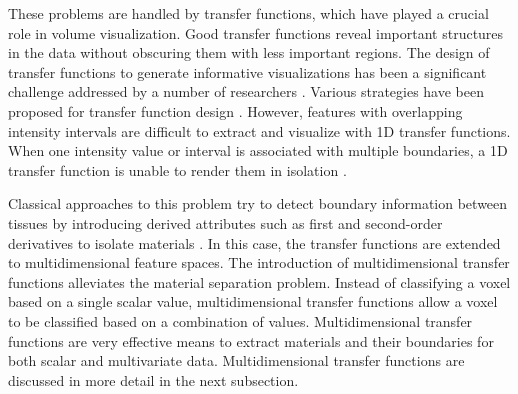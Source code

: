 These problems are handled by transfer functions, which have played a crucial role in volume visualization.
Good transfer functions reveal important structures in the data without obscuring them with less important regions.
The design of transfer functions to generate informative visualizations has been a significant challenge addressed by a number of researchers \cite{pfister_transfer_2001}.
Various strategies have been proposed for transfer function design \cite{hadwiger_real-time_2006}.
However, features with overlapping intensity intervals are difficult to extract and visualize with 1D transfer functions.
When one intensity value or interval is associated with multiple boundaries, a 1D transfer function is unable to render them in isolation \cite{kniss_multidimensional_2002}.

Classical approaches to this problem try to detect boundary information between tissues by introducing derived attributes such as first and second-order derivatives to isolate materials \cite{kindlmann_semi-automatic_1998} \cite{kniss_multidimensional_2002}. In this case, the transfer functions are extended to multidimensional feature spaces. 
The introduction of multidimensional transfer functions alleviates the material separation problem.
Instead of classifying a voxel based on a single scalar value, multidimensional transfer functions allow a voxel to be classified based on a combination of values.
Multidimensional transfer functions are very effective means to extract materials and their boundaries for both scalar and multivariate data.
Multidimensional transfer functions are discussed in more detail in the next subsection.

